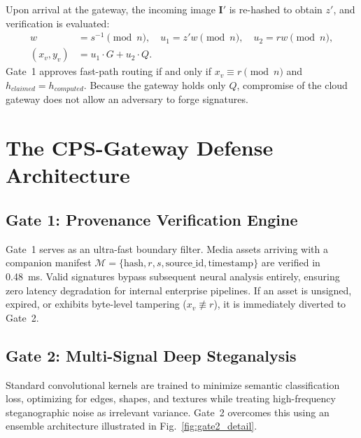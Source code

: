 \documentclass[conference]{IEEEtran}
\begin{document}
Upon arrival at the gateway, the incoming image $\mathbf{I}'$ is re-hashed to obtain $z'$, and verification is evaluated:
\begin{equation}
\begin{aligned}
    w &= s^{-1} \pmod n, \quad u_1 = z' w \pmod n, \quad u_2 = r w \pmod n, \\
    (x_v, y_v) &= u_1 \cdot G + u_2 \cdot Q.
\end{aligned}
\end{equation}
Gate~1 approves fast-path routing if and only if $x_v \equiv r \pmod n$ and $h_{claimed} = h_{computed}$. Because the gateway holds only $Q$, compromise of the cloud gateway does not allow an adversary to forge signatures.

\section{The CPS-Gateway Defense Architecture}
\label{sec:architecture}

\subsection{Gate 1: Provenance Verification Engine}
Gate~1 serves as an ultra-fast boundary filter. Media assets arriving with a companion manifest $\mathcal{M} = \{\text{hash}, r, s, \text{source\_id}, \text{timestamp}\}$ are verified in 0.48~ms. Valid signatures bypass subsequent neural analysis entirely, ensuring zero latency degradation for internal enterprise pipelines. If an asset is unsigned, expired, or exhibits byte-level tampering ($x_v \not\equiv r$), it is immediately diverted to Gate~2.

\subsection{Gate 2: Multi-Signal Deep Steganalysis}
Standard convolutional kernels are trained to minimize semantic classification loss, optimizing for edges, shapes, and textures while treating high-frequency steganographic noise as irrelevant variance. Gate~2 overcomes this using an ensemble architecture illustrated in Fig.~\ref{fig:gate2_detail}.
\end{document}
